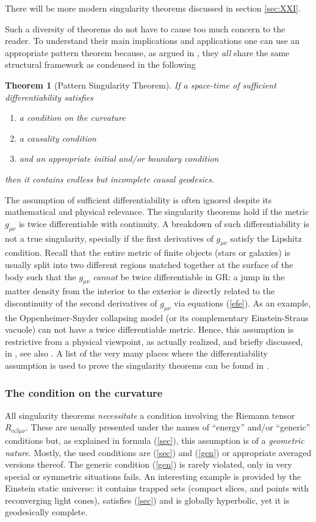\documentclass[12pt]{iopart}
\newtheorem{theorem}{Theorem}
\begin{document}
There will be more modern singularity theorems discussed in section \ref{sec:XXI}.

Such a diversity of theorems do not have to cause too much concern to the reader. To understand their main implications and applications one can use an appropriate pattern theorem because, as argued in \cite{S1,S5}, they {\em all} share the same structural framework as condensed in the following
\begin{theorem}[Pattern Singularity Theorem]\label{th:pattern}
If a space-time of sufficient differentiability satisfies
\begin{enumerate}
\item a condition on the curvature
\item a causality condition
\item and an appropriate initial and/or boundary condition
\end{enumerate}
then it contains endless but  incomplete  causal geodesics.
\end{theorem}
The assumption  of sufficient differentiability is often ignored despite its mathematical and physical relevance. 
The singularity theorems hold if the metric $g_{\mu\nu}$ is twice differentiable with 
continuity. A breakdown of such differentiability is not a true singularity, 
specially if the first derivatives of $g_{\mu\nu}$ satisfy the Lipshitz condition. Recall that the entire metric of finite objects 
(stars or galaxies) is usually split into two different 
regions matched together at the surface of the body such that the 
$g_{\mu\nu}$ {\em cannot} be twice differentiable in GR: a jump in the matter density from the interior to the exterior is directly related to the discontinuity of the second derivatives of $g_{\mu\nu}$ via equations (\ref{efe}). As 
an example, the Oppenheimer-Snyder collapsing model (or its complementary Einstein-Straus vacuole) can not have a twice differentiable metric. Hence, this assumption is restrictive from a physical viewpoint, as actually realized, and briefly discussed, in \cite{HE}, see also \cite{Cla3,Cla4}. A list of the very many places where the differentiability assumption is used to prove the singularity theorems can be found in \cite{S1}.



 
\subsubsection{The condition on the curvature}\label{subsec:sec}
All singularity theorems {\em necessitate} a condition involving the Riemann tensor $R_{\alpha\beta\mu\nu}$. These are
usually presented under the names of ``energy'' and/or ``generic'' conditions but, as explained in formula (\ref{sec}), this assumption is of a {\em geometric nature}. Mostly, the used conditions are (\ref{sec}) and (\ref{gen}) or appropriate averaged versions thereof. The generic condition (\ref{gen}) is rarely violated, only in very special or symmetric situations fails. 
An interesting example is provided by the Einstein static universe: it contains trapped sets (compact slices, and points with reconverging light cones), satisfies (\ref{sec}) and is globally hyperbolic, yet it is geodesically complete. 
\end{document}

